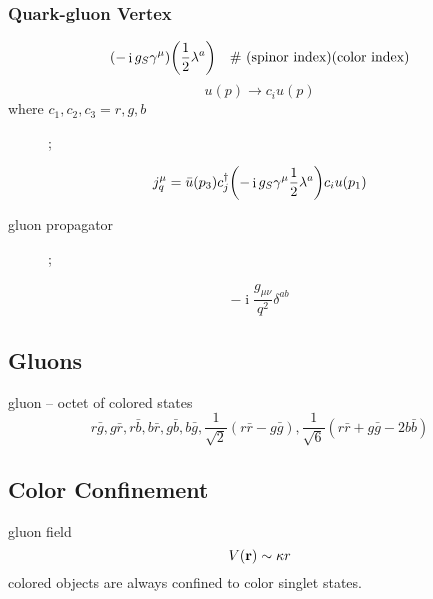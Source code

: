 \documentclass[a4paper]{article}
\DeclareMathOperator{\I}{\mathrm{i}}
\DeclareMathOperator{\ra}{\rightarrow}
\newcommand{\pa}{particle}
\numberwithin{equation}{section}
\begin{document}
\subsubsection{Quark-gluon Vertex}
\begin{equation}\label{key}
(-\I g_S\gamma^\mu) \qty(\dfrac{1}{2}\lambda^a) \quad\text{\# (spinor index)(color index)}
\end{equation}
\begin{equation}\label{key}
u(p) \ra c_i u(p) 
\end{equation}
where $ c_1, c_2, c_3 = r,g,b $\\
\begin{figure}[H]
	\centering
	\feynmandiagram [vertical = b to d]{
		a [particle=q] -- [fermion,edge label=$ p_1 $] b [label=$ {\mu,a} $] -- [fermion,edge label=$ p_3 $] c [particle=q],
		b -- [gluon] d [\pa=g],
	};
\end{figure}
\begin{equation}\label{key}
j_q^\mu = \bar{u}(p_3) c_j^\dagger \qty(-\I g_S\gamma^\mu \dfrac{1}{2}\lambda^a) c_i u(p_1) 
\end{equation}

gluon propagator
\begin{figure}[H]
	\centering
	\feynmandiagram [horizontal = a to b]{
		a [\pa=$ {\mu,a} $] -- [gluon,edge label=$ g $] 
		b [\pa=$ {\nu,b} $],
	};
\end{figure}
\begin{equation}\label{key}
-\I\dfrac{g_{\mu\nu}}{q^2}\delta^{ab}
\end{equation}

\subsection{Gluons}
gluon -- octet of colored states
\begin{equation}\label{key}
r\bar{g}, g\bar{r}, r\bar{b}, b\bar{r}, g\bar{b}, b\bar{g}, \dfrac{1}{\sqrt{2}}(r\bar{r} - g\bar{g}), \dfrac{1}{\sqrt{6}}(r\bar{r} + g\bar{g} - 2b\bar{b})
\end{equation}

\subsection{Color Confinement}
gluon field
\begin{equation}\label{key}
V(\vb{r}) \sim \kappa r
\end{equation}
colored objects are always confined to color singlet states.
\end{document}
